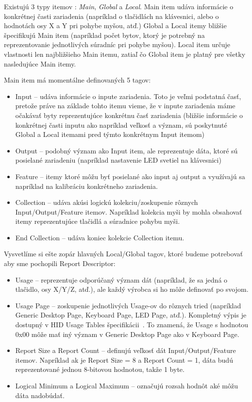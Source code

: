 Existujú 3 typy itemov : \textit{Main}, \textit{Global} a \textit{Local}. Main item udáva informácie o konkrétnej časti zariadenia (napríklad o tlačidlách na klávesnici, alebo o hodnotách osy X a Y pri pohybe myšou, atď.) Global a Local itemy bližšie špecifikujú Main item (napríklad počet bytov, ktorý je potrebný na reprezentovanie jednotlivých súradníc pri pohybe myšou). Local item určuje vlastnosti len najbližšieho Main itemu, zatiaľ čo Global item je platný pre všetky nasledujúce Main itemy.

Main item má momentálne definovaných 5 tagov:
\begin{itemize}
\item Input -- udáva informácie o inpute zariadenia. Toto je veľmi podstatná časť, pretože práve na základe tohto itemu vieme, že v inpute zariadenia máme očakávať byty reprezentujúce konkrétnu časť zariadenia (bližšie informácie o konkrétnej časti inputu ako napríklad veľkosť a význam, sú poskytnuté Global a Local itemami pred týmto konkrétnym Input itemom)
\item Output -- podobný význam ako Input item, ale reprezentuje dáta, ktoré sú posielané zariadeniu (napríklad nastavenie LED svetiel na klávesnici)
\item Feature -- itemy ktoré môžu byť posielané ako input aj output a využívajú sa napríklad na kalibráciu konkrétneho zariadenia.
\item Collection -- udáva akúsi logickú kolekciu/zoskupenie rôznych Input/Output/Feature itemov. Napríklad kolekcia myši by mohla obsahovať itemy reprezentujúce tlačidlá a súradnice pohybu myši.
\item End Collection -- udáva koniec kolekcie Collection itemu.
\end{itemize}

Vysvetlíme si ešte zopár hlavných Local/Global tagov, ktoré budeme potrebovať aby sme pochopili Report Descriptor:
\begin{itemize}
\item Usage -- reprezentuje odporúčaný význam dát (napríklad, že sa jedná o tlačidlo, osy X/Y/Z, atď.), ale každý výrobca si ho môže definovať po svojom.
\item Usage Page -- zoskupenie jednotlivých Usage-ov do rôznych tried (napríklad Generic Desktop Page, Keyboard Page, LED Page, atď.). Kompletný výpis je dostupný v HID Usage Tables špecifikácii~\cite{usage_pages}. To znamená, že Usage s hodnotou 0x00 môže mať iný význam v Generic Desktop Page ako v Keyboard Page.
\item Report Size a Report Count -- definujú veľkosť dát Input/Output/Feature itemov. Napríklad ak je Report Size = 8 a Report Count = 1, dáta budú reprezentované jednou 8-bitovou hodnotou, takže 1 byte.
\item Logical Minimum a Logical Maximum -- označujú rozsah hodnôt aké môžu dáta nadobúdať.
\end{itemize}

